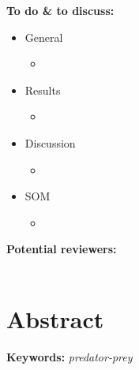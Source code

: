 \documentclass[11pt]{article}
\newenvironment{myabstract}{\clearpage\section*{Abstract}}{\clearpage}
\newenvironment{mysignificance}{\clearpage\section*{Significance}}{\clearpage}
\begin{document}
\baselineskip9pt
\noindent
\textbf{To do \& to discuss:}
\begin{itemize}
	\item{General}
	\begin{itemize}
		\item 
	\end{itemize}
	\item Results
	\begin{itemize}
		\item
	\end{itemize}
	\item Discussion
	\begin{itemize}
		\item 
	\end{itemize}
	\item SOM
	\begin{itemize}
		\item 
	\end{itemize}
\end{itemize}

\noindent
\textbf{Potential reviewers:}\\\\
	

\clearpage

\baselineskip12pt




\baselineskip20pt
\linenumbers

\begin{myabstract}
	
	\lipsum[66]
		
	\noindent\textbf{Keywords:} 
		\emph{
			predator-prey
		}
\end{myabstract}



%	
%	


\clearpage
\end{document}
